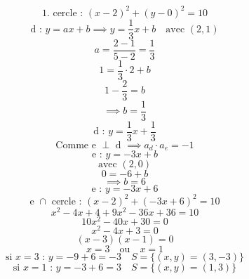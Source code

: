 \documentclass{article}
\begin{document}
\begin{center}
\end{center}

\[
    \text{1. cercle : } (x-2)^2 + (y-0)^2 = 10
\]
\[
    \text{d : } y = ax+b \implies y = \frac{1}{3}x+b \quad \text{avec } (2,1)
\]
\[
    a = \frac{2-1}{5-2} = \frac{1}{3}
\]
\[
    1 = \frac{1}{3} \cdot 2 + b
\]
\[
    1 - \frac{2}{3} = b
\]
\[
    \implies b = \frac{1}{3}
\]
\[
    \text{d : } y = \frac{1}{3}x + \frac{1}{3}
\]
\[
    \text{Comme e } \perp \text{ d } \implies a_d \cdot a_e = -1
\]
\[
    \text{e : } y = -3x+b
\]
\[
    \text{avec } (2,0)
\]
\[
0 = -6 + b
\]
\[
    \implies b = 6
\]
\[
    \text{e : } y = -3x+6
\]
\[
    \text{e } \cap \text{ cercle : } (x-2)^2 + (-3x+6)^2 = 10
\]
\[
    x^2 - 4x + 4 + 9x^2 - 36x + 36 = 10
\]
\[
    10x^2 - 40x + 30 = 0
\]
\[
    x^2 - 4x + 3 = 0
\]
\[
    (x-3)(x-1) = 0
\]
\[
    x=3 \quad \text{ou} \quad x=1
\]
\[
    \text{si } x=3 \text{ : } y = -9+6 = -3 \quad S = \{(x,y) = (3,-3)\}
\]
\[
    \text{si } x=1 \text{ : } y = -3+6 = 3 \quad S = \{(x,y) = (1,3)\}
\]
\end{document}
